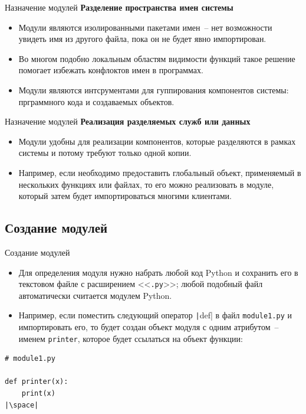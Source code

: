 \documentclass[aspectratio=169, mathserif]{beamer}	%
\begin{document}
\begin{frame}[fragile]{Назначение модулей}
\scriptsize
\textcolor{tpugreen}{\textbf{Разделение пространства имен системы}}
\vfill
\begin{itemize}
	\item Модули являются изолированными пакетами имен~-- нет возможности увидеть имя из другого файла, пока он не будет явно импортирован.
	\vfill
	\item Во многом подобно локальным областям видимости функций такое решение помогает избежать конфлоктов имен в программах.
	\vfill
	\item Модули являются интсрументами для гуппирования компонентов системы: прграммного кода и создаваемых объектов.
\end{itemize}
\vfill
\end{frame}

\begin{frame}[fragile]{Назначение модулей}
\scriptsize
\textcolor{tpugreen}{\textbf{Реализация разделяемых служб или данных}}
\vfill
\begin{itemize}
	\item Модули удобны для реализации компонентов, которые разделяются в рамках системы и потому требуют только одной копии.
	\vfill
	\item Например, если необходимо предоставить глобальный объект, применяемый в нескольких функциях или файлах, то его можно реализовать в модуле, который затем будет импортироваться многими клиентами.
\end{itemize}
\vfill
\end{frame}

\subsection{Создание модулей}
\begin{frame}[fragile]{Создание модулей}
\scriptsize
\begin{itemize}
\item Для определения модуля нужно набрать любой код Python и сохранить его в текстовом файле с расширением <<\texttt{.py}>>; любой подобный файл автоматически считается модулем Python.
\item Например, если поместить следующий оператор \texttt|def| в файл \texttt{module1.py} и импортировать его, то будет создан объект модуля с одним атрибутом~-- именем \texttt{printer}, которое будет ссылаться на объект функции:
\end{itemize}
\vfill
\begin{verbatim}
# module1.py

def printer(x):
    print(x)
|\space|
\end{verbatim}
\vfill
\end{frame}
\end{document}
